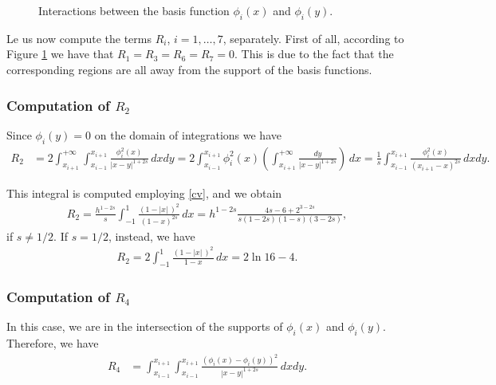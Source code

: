 {\begin{figure}
\centerline{\box\figBoxA}
\caption{Interactions between the basis function $\phi_i(x)$ and $\phi_i(y)$.}\label{dia}
\end{figure}
Le us now compute the terms $R_i$, $i=1,\ldots,7$, separately. First of all, according to Figure \ref{dia} we have that $R_1=R_3=R_6=R_7=0.$ This is due to the fact that the corresponding regions are all away from the support of the basis functions. 
\subsubsection*{Computation of $R_2$}
Since $\phi_i(y) = 0$ on the domain of integrations we have
\begin{align*}
	R_2 &= 2\int_{x_{i+1}}^{+\infty}\int_{x_{i-1}}^{x_{i+1}} \frac{\phi_i^2(x)}{|x-y|^{1+2s}}\,dxdy = 2\int_{x_{i-1}}^{x_{i+1}}\phi_i^2(x)\left(\int_{x_{i+1}}^{+\infty} \frac{dy}{|x-y|^{1+2s}}\right)\,dx = \frac{1}{s}\int_{x_{i-1}}^{x_{i+1}}\frac{\phi_i^2(x)}{(x_{i+1}-x)^{2s}}\,dxdy.
\end{align*}

This integral is computed employing \eqref{cv}, and we obtain
\begin{align}\label{R2}
	R_2 = \frac{h^{1-2s}}{s}\int_{-1}^1 \frac{(1-|x|\,)^2}{(1-x)^{2s}}\,dx = h^{1-2s}\frac{4s-6+2^{3-2s}}{s(1-2s)(1-s)(3-2s)}, 
\end{align}
if $s\neq 1/2$. If $s=1/2$, instead, we have
\begin{align*}
	R_2 = 2\int_{-1}^1 \frac{(1-|x|\,)^2}{1-x}\,dx = 2\ln 16-4.
\end{align*}

\subsubsection*{Computation of $R_4$}
In this case, we are in the intersection of the supports of $\phi_i(x)$ and $\phi_i(y)$. Therefore, we have
\begin{align*}
	R_4 &= \int_{x_{i-1}}^{x_{i+1}}\int_{x_{i-1}}^{x_{i+1}} \frac{(\phi_i(x)-\phi_i(y))^2}{|x-y|^{1+2s}}\,dxdy. 
\end{align*}

}
